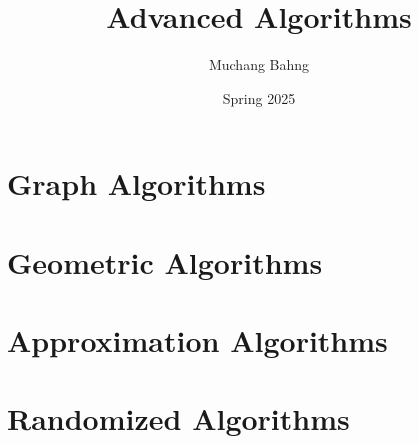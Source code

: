 \documentclass{article}
\begin{document}
\title{Advanced Algorithms}
\author{Muchang Bahng}
\date{Spring 2025}

\maketitle
\tableofcontents
\pagebreak

\section{Graph Algorithms}

\section{Geometric Algorithms}

\section{Approximation Algorithms}

\section{Randomized Algorithms}
\end{document}

